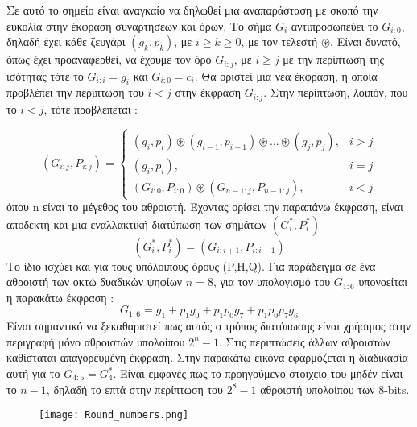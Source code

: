 Σε αυτό το σημείο είναι αναγκαίο να δηλωθεί μια αναπαράσταση με σκοπό την ευκολία στην
έκφραση συναρτήσεων και όρων. Το σήμα $G_{i}$ αντιπροσωπεύει το $G_{i:0}$, δηλαδή
έχει κάθε ζευγάρι $(g_k,p_k)$, με $ i \geq k \geq 0 $, με τον τελεστή $\circledast$.
Είναι δυνατό, όπως έχει προαναφερθεί, να έχουμε τον όρο $G_{i:j}$, με $ i \geq j$ με
την περίπτωση της ισότητας τότε το $G_{i:i} = g_i$ και $G_{i:0}=c_i$. Θα οριστεί μια νέα έκφραση, η οποία 
προβλέπει την περίπτωση του $i < j$ στην έκφραση $G_{i:j}$. Στην περίπτωση, λοιπόν, που το
$i < j$, τότε προβλέπεται :

\begin{equation}
    (G_{i:j},P_{i:j}) =
    \begin{cases}
        (g_i,p_i)\circledast(g_{i-1},p_{i-1})\circledast...\circledast(g_j,p_j) ,& i > j \\
        (g_i,p_i) ,& i = j \\
        (G_{i:0},P_{i:0}) \circledast (G_{n-1:j},P_{n-1:j}) ,& i < j
    \end{cases}
\end{equation}
όπου n είναι το μέγεθος του αθροιστή. Έχοντας ορίσει την παραπάνω έκφραση, είναι αποδεκτή και μια εναλλακτική διατύπωση των σημάτων $(G^*_i,P^*_i)$
\begin{equation}
    (G^*_i,P^*_i) = (G_{i:i+1},P_{i:i+1})
\end{equation}
Το ίδιο ισχύει και για τους υπόλοιπους όρους (P,H,Q).
Για παράδειγμα σε ένα αθροιστή των οκτώ δυαδικών ψηφίων $n=8$, για τον υπολογισμό του 
$G_{1:6}$ υπονοείται η παρακάτω έκφραση :
\begin{equation*}
    G_{1:6} = g_1 + p_1g_0 + p_1p_0g_7 + p_1p_0p_7g_6
\end{equation*}
Είναι σημαντικό να ξεκαθαριστεί πως αυτός ο τρόπος διατύπωσης είναι χρήσιμος στην περιγραφή μόνο αθροιστών υπολοίπου $2^n-1$. Στις περιπτώσεις άλλων αθροιστών καθίσταται απαγορευμένη έκφραση. Στην παρακάτω εικόνα εφαρμόζεται η διαδικασία αυτή για το $G_{4:5} = G^*_{4}$. Είναι εμφανές πως το προηγούμενο στοιχείο του μηδέν είναι το $n-1$, δηλαδή το επτά στην περίπτωση του $2^8-1$ αθροιστή υπολοίπου των 8-bits. 
\begin{figure}[H]
    \centering
    \texttt{[image: Round\_numbers.png]}
\end{figure}


